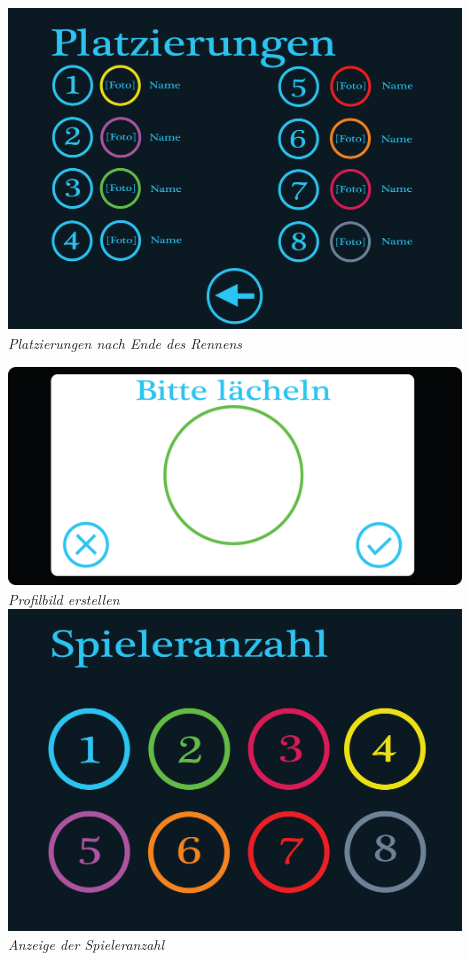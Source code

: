 \begin{flushright}
\includegraphics[width=0.9\textwidth]{img/platzierungen.png}\\
\textit{Platzierungen nach Ende des Rennens}

\newpage

\includegraphics[width=0.9\textwidth]{img/profilbild_erstellen.png}\\
\textit{Profilbild erstellen}\\[4em]

\includegraphics[width=0.9\textwidth]{img/spieleranzahl.png}\\
\textit{Anzeige der Spieleranzahl}


\end{flushright}
